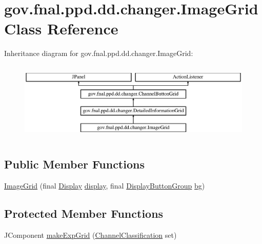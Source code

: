 \hypertarget{classgov_1_1fnal_1_1ppd_1_1dd_1_1changer_1_1ImageGrid}{\section{gov.\-fnal.\-ppd.\-dd.\-changer.\-Image\-Grid Class Reference}
\label{classgov_1_1fnal_1_1ppd_1_1dd_1_1changer_1_1ImageGrid}
}
Inheritance diagram for gov.\-fnal.\-ppd.\-dd.\-changer.\-Image\-Grid\-:\begin{figure}[H]
\begin{center}
\leavevmode
\includegraphics[height=3.783784cm]{classgov_1_1fnal_1_1ppd_1_1dd_1_1changer_1_1ImageGrid}
\end{center}
\end{figure}
\subsection*{Public Member Functions}
\begin{DoxyCompactItemize}
\item 
\hyperlink{classgov_1_1fnal_1_1ppd_1_1dd_1_1changer_1_1ImageGrid_a34570a94e8247dd356c8212d43979788}{Image\-Grid} (final \hyperlink{interfacegov_1_1fnal_1_1ppd_1_1dd_1_1signage_1_1Display}{Display} \hyperlink{classgov_1_1fnal_1_1ppd_1_1dd_1_1changer_1_1ChannelButtonGrid_a3c06b51489dcaacd16f6efcefe06bcaa}{display}, final \hyperlink{classgov_1_1fnal_1_1ppd_1_1dd_1_1util_1_1DisplayButtonGroup}{Display\-Button\-Group} \hyperlink{classgov_1_1fnal_1_1ppd_1_1dd_1_1changer_1_1ChannelButtonGrid_adf258a89161282e5215b4642ecbec812}{bg})
\end{DoxyCompactItemize}
\subsection*{Protected Member Functions}
\begin{DoxyCompactItemize}
\item 
J\-Component \hyperlink{classgov_1_1fnal_1_1ppd_1_1dd_1_1changer_1_1ImageGrid_abc159f4865dd5542cfa75bdbbda1bd30}{make\-Exp\-Grid} (\hyperlink{classgov_1_1fnal_1_1ppd_1_1dd_1_1changer_1_1ChannelClassification}{Channel\-Classification} set)
\end{DoxyCompactItemize}
